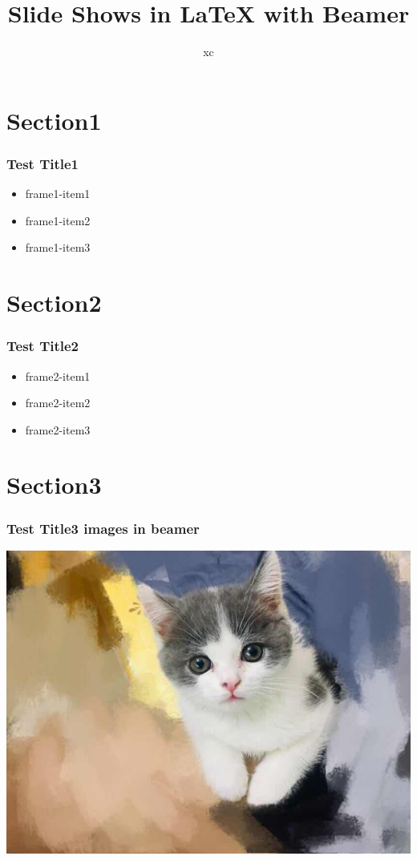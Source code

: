 \documentclass{beamer}
\title{Slide Shows in {\LaTeX} with Beamer}
\author{xc}
\begin{document}
\maketitle

\section{Section1}

\begin{frame}
    \frametitle{Test Title1}
    \begin{itemize}
        \item frame1-item1\pause
        \item frame1-item2\pause
        \item frame1-item3
    \end{itemize}
\end{frame}

\section{Section2}

\begin{frame}
    \frametitle{Test Title2}
    \begin{itemize}
        \item frame2-item1\pause
        \item frame2-item2\pause
        \item frame2-item3
    \end{itemize}
\end{frame}

\section{Section3}

\begin{frame}
    \frametitle{Test Title3 images in beamer}
    \includegraphics[height=.85\textheight]{Yugor.jpg}
\end{frame}
\end{document}
